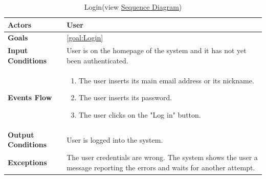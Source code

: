 \begin{table}[H]
	\centering
	\def\arraystretch{1.5}
	\begin{tabular}{|m{7cm}|m{7cm}|}
		\hline
		\textbf{Actors}            & User	    \\ \hline
		\textbf{Goals}             & \ref{goal:Login}           \\ \hline
		\textbf{Input Conditions}  & User is on the homepage of the system and it has not yet been authenticated.           \\ \hline
		\textbf{Events Flow}       &    
			 	\begin{enumerate}
			 		\item The user inserts its main email address or its nickname.
			 		\item The user inserts its password.
			 		\item The user clicks on the "Log in" button.
			 	\end{enumerate}\\ \hline
		\textbf{Output Conditions} & User is logged into the system.          \\ \hline
		\textbf{Exceptions}        & The user credentials are wrong. The system shows the user a message reporting the errors and waits for another attempt.         \\ \hline
	\end{tabular}
	\caption[Login]{{Login}\label{UseCaseDescr:LoginNormal} (view \hyperref[SeqDiagr:LoginNormal]{Sequence Diagram})}
\end{table}

